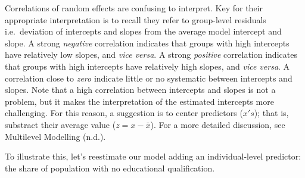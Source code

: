 \documentclass[
  letterpaper,
  DIV=11,
  numbers=noendperiod,
  oneside]{scrreprt}
\newenvironment{Shaded}{\begin{snugshade}}{\end{snugshade}}
\newcommand{\AttributeTok}[1]{\textcolor[rgb]{0.40,0.45,0.13}{#1}}
\newcommand{\CommentTok}[1]{\textcolor[rgb]{0.37,0.37,0.37}{#1}}
\newcommand{\DecValTok}[1]{\textcolor[rgb]{0.68,0.00,0.00}{#1}}
\newcommand{\FunctionTok}[1]{\textcolor[rgb]{0.28,0.35,0.67}{#1}}
\newcommand{\NormalTok}[1]{\textcolor[rgb]{0.00,0.23,0.31}{#1}}
\newcommand{\OtherTok}[1]{\textcolor[rgb]{0.00,0.23,0.31}{#1}}
\newcommand{\SpecialCharTok}[1]{\textcolor[rgb]{0.37,0.37,0.37}{#1}}
\begin{document}
Correlations of random effects are confusing to interpret. Key for their
appropriate interpretation is to recall they refer to group-level
residuals i.e.~deviation of intercepts and slopes from the average model
intercept and slope. A strong \emph{negative} correlation indicates that
groups with high intercepts have relatively low slopes, and \emph{vice
versa}. A strong \emph{positive} correlation indicates that groups with
high intercepts have relatively high slopes, and \emph{vice versa}. A
correlation close to \emph{zero} indicate little or no systematic
between intercepts and slopes. Note that a high correlation between
intercepts and slopes is not a problem, but it makes the interpretation
of the estimated intercepts more challenging. For this reason, a
suggestion is to center predictors (\(x's\)); that is, substract their
average value (\(z = x - \bar{x}\)). For a more detailed discussion, see
Multilevel Modelling (n.d.).

To illustrate this, let's reestimate our model adding an
individual-level predictor: the share of population with no educational
qualification.

\begin{Shaded}
\end{Shaded}
\end{document}
